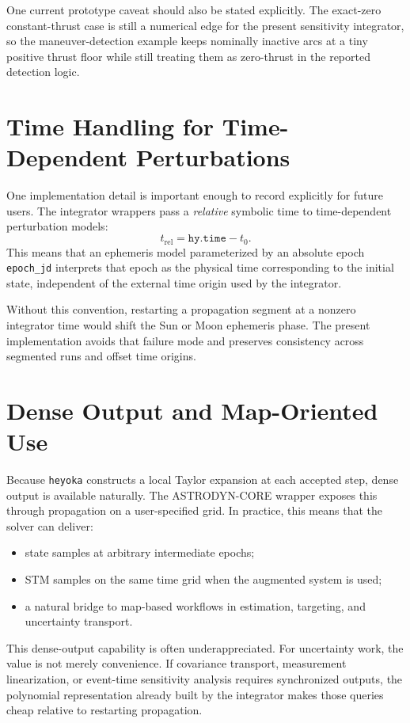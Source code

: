 \documentclass[11pt]{article}
\begin{document}
One current prototype caveat should also be stated explicitly. The exact-zero
constant-thrust case is still a numerical edge for the present sensitivity
integrator, so the maneuver-detection example keeps nominally inactive arcs at
a tiny positive thrust floor while still treating them as zero-thrust in the
reported detection logic.

\section{Time Handling for Time-Dependent Perturbations}

One implementation detail is important enough to record explicitly for future
users. The integrator wrappers pass a \emph{relative} symbolic time to
time-dependent perturbation models:
\begin{equation}
t_{\mathrm{rel}} = \texttt{hy.time} - t_0.
\end{equation}
This means that an ephemeris model parameterized by an absolute epoch
\texttt{epoch\_jd} interprets that epoch as the physical time corresponding to
the initial state, independent of the external time origin used by the
integrator.

Without this convention, restarting a propagation segment at a nonzero
integrator time would shift the Sun or Moon ephemeris phase. The present
implementation avoids that failure mode and preserves consistency across
segmented runs and offset time origins.

\section{Dense Output and Map-Oriented Use}

Because \texttt{heyoka} constructs a local Taylor expansion at each accepted
step, dense output is available naturally. The ASTRODYN-CORE wrapper exposes
this through propagation on a user-specified grid. In practice, this means that
the solver can deliver:
\begin{itemize}
    \item state samples at arbitrary intermediate epochs;
    \item STM samples on the same time grid when the augmented system is used;
    \item a natural bridge to map-based workflows in estimation, targeting, and
    uncertainty transport.
\end{itemize}

This dense-output capability is often underappreciated. For uncertainty work,
the value is not merely convenience. If covariance transport, measurement
linearization, or event-time sensitivity analysis requires synchronized outputs,
the polynomial representation already built by the integrator makes those
queries cheap relative to restarting propagation.
\end{document}
